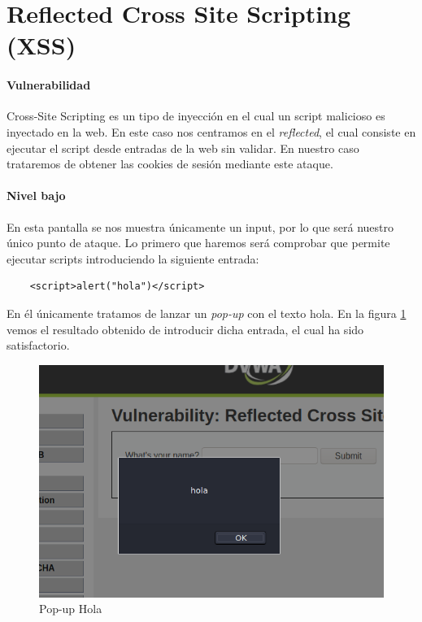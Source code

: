 \section{Reflected Cross Site Scripting (XSS)}
\paragraph{Vulnerabilidad} Cross-Site Scripting es un tipo de inyección en el cual un
script malicioso es inyectado en la web. En este caso nos centramos en el {\it reflected}, 
el cual consiste en ejecutar el script desde entradas de la web sin validar. En nuestro caso 
trataremos de obtener las cookies de sesión mediante este ataque.
\paragraph{Nivel bajo} En esta pantalla se nos muestra únicamente un input,
por lo que será nuestro único punto de ataque. Lo primero que haremos será comprobar que permite ejecutar
scripts introduciendo la siguiente entrada: 
\begin{lstlisting}
    <script>alert("hola")</script>
\end{lstlisting}
En él únicamente tratamos de lanzar un {\it pop-up} con el texto hola.
En la figura \ref{fig:hola} vemos el resultado obtenido de introducir dicha entrada, el cual
 ha sido satisfactorio.
\begin{figure}[ht!]
    \centering
    \includegraphics[width=14cm]{img/xss/hola.png}
    \caption{Pop-up Hola}
    \label{fig:hola}
\end{figure}

